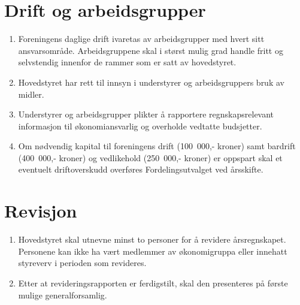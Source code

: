 \documentclass[8pt,norsk,a4paper]{article}
\begin{document}

\section{Drift og arbeidsgrupper}
\begin{enumerate}
	\item{Foreningens daglige drift ivaretas av arbeidsgrupper med hvert sitt ansvarsområde. Arbeidsgruppene skal i størst mulig grad handle fritt og selvstendig innenfor de rammer som er satt av hovedstyret.}
	\item{Hovedstyret har rett til innsyn i understyrer og arbeidsgruppers bruk av midler.}
	\item{Understyrer og arbeidsgrupper plikter å rapportere regnskapsrelevant informasjon til økonomiansvarlig og overholde vedtatte budsjetter.}
	\item{Om nødvendig kapital til foreningens drift (100~000,- kroner) samt bardrift (400~000,- kroner) og vedlikehold (250~000,- kroner) er oppspart skal et eventuelt driftoverskudd overføres Fordelingsutvalget ved årsskifte.}
\end{enumerate}

\section{Revisjon}
\begin{enumerate}
	\item{Hovedstyret skal utnevne minst to personer for å revidere årsregnskapet. Personene kan ikke ha vært medlemmer av økonomigruppa eller innehatt styreverv i perioden som revideres.}
	\item{Etter at revideringsrapporten er ferdigstilt, skal den presenteres på første mulige generalforsamlig.}
\end{enumerate}
\end{document}
